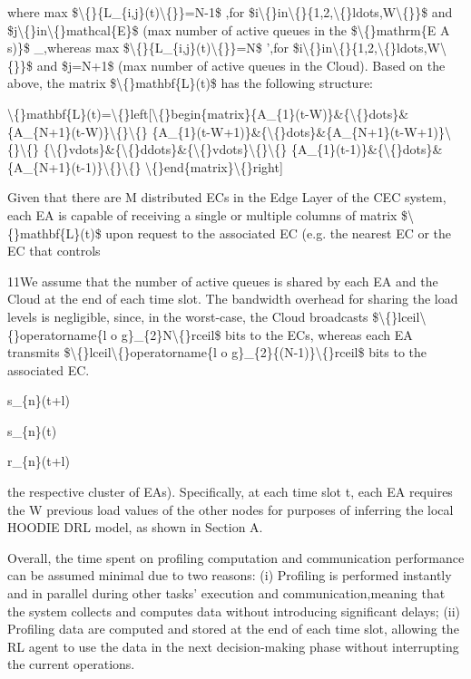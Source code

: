 \documentclass{article}
\begin{document}
where max \$\textbackslash\{\}\{L\_\{i,j\}(t)\textbackslash\{\}\}=N-1\$ ,for \$i\textbackslash\{\}in\textbackslash\{\}\{1,2,\textbackslash\{\}ldots,W\textbackslash\{\}\}\$ and \$j\textbackslash\{\}in\textbackslash\{\}mathcal\{E\}\$ (max number of active queues in the \$\textbackslash\{\}mathrm\{E A s)\}\$ \_,whereas max \$\textbackslash\{\}\{L\_\{i,j\}(t)\textbackslash\{\}\}=N\$ ',for \$i\textbackslash\{\}in\textbackslash\{\}\{1,2,\textbackslash\{\}ldots,W\textbackslash\{\}\}\$ and \$j=N+1\$ (max number of active queues in the Cloud). Based on the above, the matrix \$\textbackslash\{\}mathbf\{L\}(t)\$ has the following structure:

\textbackslash\{\}mathbf\{L\}(t)=\textbackslash\{\}left[\textbackslash\{\}begin\{matrix\}\{A\_\{1\}(t-W)\}\&\{\textbackslash\{\}dots\}\&\{A\_\{N+1\}(t-W)\}\textbackslash\{\}\textbackslash\{\} \{A\_\{1\}(t-W+1)\}\&\{\textbackslash\{\}dots\}\&\{A\_\{N+1\}(t-W+1)\}\textbackslash\{\}\textbackslash\{\} \{\textbackslash\{\}vdots\}\&\{\textbackslash\{\}ddots\}\&\{\textbackslash\{\}vdots\}\textbackslash\{\}\textbackslash\{\} \{A\_\{1\}(t-1)\}\&\{\textbackslash\{\}dots\}\&\{A\_\{N+1\}(t-1)\}\textbackslash\{\}\textbackslash\{\} \textbackslash\{\}end\{matrix\}\textbackslash\{\}right]

Given that there are M distributed ECs in the Edge Layer of the CEC system, each EA is capable of receiving a single or multiple columns of matrix \$\textbackslash\{\}mathbf\{L\}(t)\$ upon request to the associated EC (e.g. the nearest EC or the EC that controls

11We assume that the number of active queues is shared by each EA and the Cloud at the end of each time slot. The bandwidth overhead for sharing the load levels is negligible, since, in the worst-case, the Cloud broadcasts \$\textbackslash\{\}lceil\textbackslash\{\}operatorname\{l o g\}\_\{2\}N\textbackslash\{\}rceil\$ bits to the ECs, whereas each EA transmits \$\textbackslash\{\}lceil\textbackslash\{\}operatorname\{l o g\}\_\{2\}\{(N-1)\}\textbackslash\{\}rceil\$ bits to the associated EC.

s\_\{n\}(t+l)

s\_\{n\}(t)

r\_\{n\}(t+l)

the respective cluster of EAs). Specifically, at each time slot t, each EA requires the W previous load values of the other nodes for purposes of inferring the local HOODIE DRL model, as shown in Section A.

Overall, the time spent on profiling computation and communication performance can be assumed minimal due to two reasons: (i) Profiling is performed instantly and in parallel during other tasks' execution and communication,meaning that the system collects and computes data without introducing significant delays; (ii) Profiling data are computed and stored at the end of each time slot, allowing the RL agent to use the data in the next decision-making phase without interrupting the current operations.
\end{document}
